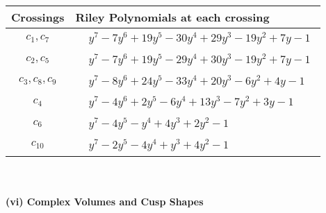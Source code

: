 \documentclass[1p]{elsarticle_modified}
\theoremstyle{definition}
\begin{document}
\begin{tabular}{m{50pt}|m{274pt}}
Crossings & \hspace{64pt}Riley Polynomials at each crossing \\
\hline $$\begin{aligned}c_{1},c_{7}\end{aligned}$$&$\begin{aligned}
&y^7-7 y^6+19 y^5-30 y^4+29 y^3-19 y^2+7 y-1
\end{aligned}$\\
\hline $$\begin{aligned}c_{2},c_{5}\end{aligned}$$&$\begin{aligned}
&y^7-7 y^6+19 y^5-29 y^4+30 y^3-19 y^2+7 y-1
\end{aligned}$\\
\hline $$\begin{aligned}c_{3},c_{8},c_{9}\end{aligned}$$&$\begin{aligned}
&y^7-8 y^6+24 y^5-33 y^4+20 y^3-6 y^2+4 y-1
\end{aligned}$\\
\hline $$\begin{aligned}c_{4}\end{aligned}$$&$\begin{aligned}
&y^7-4 y^6+2 y^5-6 y^4+13 y^3-7 y^2+3 y-1
\end{aligned}$\\
\hline $$\begin{aligned}c_{6}\end{aligned}$$&$\begin{aligned}
&y^7-4 y^5- y^4+4 y^3+2 y^2-1
\end{aligned}$\\
\hline $$\begin{aligned}c_{10}\end{aligned}$$&$\begin{aligned}
&y^7-2 y^5-4 y^4+y^3+4 y^2-1
\end{aligned}$\\
\hline
\end{tabular}\\~\\
\newpage\flushleft \textbf{(vi) Complex Volumes and Cusp Shapes}
\end{document}
